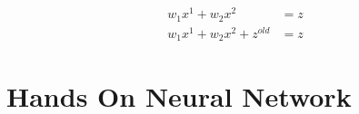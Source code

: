 	\begin{align}
		w_1 x^1 + w_2 x^2            &= z  \label{eq:recurrentneuralnetwork1} \\
		w_1 x^1 + w_2 x^2 + z^{old}  &= z  \label{eq:recurrentneuralnetwork2}
	\end{align}

	\section{Hands On Neural Network} 